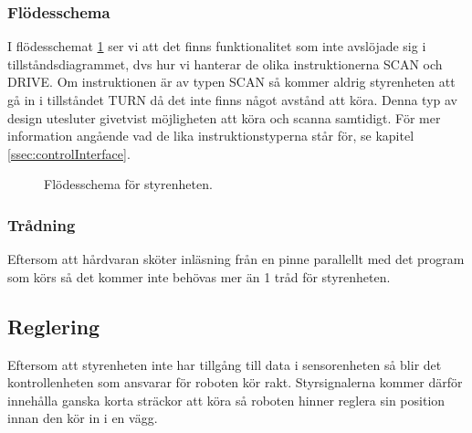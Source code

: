 \documentclass[a4paper,11pt]{article}
\begin{document}
\subsubsection{Flödesschema}

I flödesschemat \ref{fig:styrenhetFlowchart} ser vi att det finns funktionalitet som inte avslöjade sig i tillståndsdiagrammet, dvs hur vi hanterar de olika instruktionerna SCAN och DRIVE. Om instruktionen är av typen SCAN så kommer aldrig styrenheten att gå in i tillståndet TURN då det inte finns något avstånd att köra. Denna typ av design utesluter givetvist möjligheten att köra och scanna samtidigt. För mer information angående vad de lika instruktionstyperna står för, se kapitel \ref{ssec:controlInterface}. 

\begin{figure}[h!]
	\caption{Flödesschema för styrenheten.}
	\label{fig:styrenhetFlowchart}
\end{figure}

\subsubsection{Trådning}
Eftersom att hårdvaran sköter inläsning från en pinne parallellt med det program som körs så det kommer inte behövas mer än 1 tråd för styrenheten.

\subsection{Reglering}
Eftersom att styrenheten inte har tillgång till data i sensorenheten så blir det kontrollenheten som ansvarar för roboten kör rakt. Styrsignalerna kommer därför innehålla ganska korta sträckor att köra så roboten hinner reglera sin position innan den kör in i en vägg. 
\end{document}
